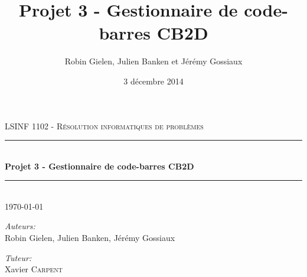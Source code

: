 \documentclass[10pt]{article}
\title{Projet 3 - Gestionnaire de code-barres CB2D}
\date{3 décembre 2014}
\author{Robin Gielen, Julien Banken et Jérémy Gossiaux}
\newcommand{\HRule}{\rule{\linewidth}{0.5mm}}
\begin{document}
\begin{titlepage}
\begin{center}


\textsc{\Large LSINF 1102 - Résolution informatiques de problèmes}\\[0.5cm]

\HRule \\[0.4cm]
{ \huge \bfseries Projet 3 - Gestionnaire de code-barres CB2D \\[0.4cm] }

\HRule \\[1.5cm]

{\large \today}

\vfill

\noindent
\begin{minipage}{0.4\textwidth}
\begin{flushleft} \large
\emph{Auteurs:}\\
Robin Gielen, Julien Banken, Jérémy Gossiaux \textsc{} 
\end{flushleft}
\end{minipage}%
\begin{minipage}{0.4\textwidth}
\begin{flushright} \large
\emph{Tuteur:} \\
Xavier \textsc{Carpent}
\end{flushright}
\end{minipage}



\end{center}
\end{titlepage}

\tableofcontents










\end{document}
